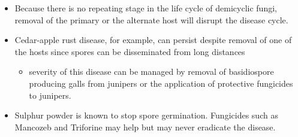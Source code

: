 \documentclass[10pt,dvipsnames,ignorenonframetext,aspectratio=169]{beamer}
\providecommand{\tightlist}{%
  \setlength{\itemsep}{0pt}\setlength{\parskip}{0pt}}
\begin{document}
\begin{frame}{}
\protect\hypertarget{section-4}{}
\begin{itemize}
\tightlist
\item
  Because there is no repeating stage in the life cycle of demicyclic
  fungi, removal of the primary or the alternate host will disrupt the
  disease cycle.
\item
  Cedar-apple rust disease, for example, can persist despite removal of
  one of the hosts since spores can be disseminated from long distances

  \begin{itemize}
  \tightlist
  \item
    severity of this disease can be managed by removal of basidiospore
    producing galls from junipers or the application of protective
    fungicides to junipers.
  \end{itemize}
\item
  Sulphur powder is known to stop spore germination. Fungicides such as
  Mancozeb and Triforine may help but may never eradicate the disease.
\end{itemize}
\end{frame}
\end{document}
